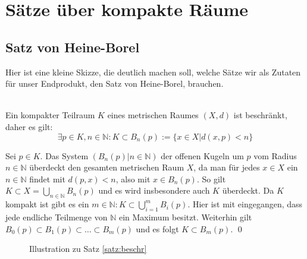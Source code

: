 \chapter{Sätze über kompakte Räume}

\section{Satz von Heine-Borel}
%
Hier ist eine kleine Skizze, die deutlich machen soll, welche Sätze wir als Zutaten für unser Endprodukt, den \glqq Satz von Heine-Borel\grqq, brauchen. \\
%
\\

%

\begin{Satz}\label{satz:beschr}
	Ein kompakter Teilraum \(K\) eines metrischen Raumes \( (X, d) \) ist beschränkt, daher es gilt:
	\[ \exists p \in K, n \in \mathbb{N} : K \subset B_n(p) := \{ x \in X | d(x,p) < n \} \]
\end{Satz}
	Sei \(p \in K\). Das System \( (B_{n}(p) | n \in \mathbb{N}) \) der offenen Kugeln um \(p\) vom Radius \(n \in \mathbb{N}\) 
	überdeckt den gesamten metrischen Raum \(X\), da man für jedes \(x \in X\) ein \(n \in \mathbb{N}\) findet mit \(d(p,x) < n\),
	also mit \(x \in B_{n}(p)\).
	So gilt \(K \subset X = \bigcup_{n \in \mathbb{N}} B_{n}(p)\) und es wird insbesondere auch \(K\) überdeckt. 
	Da \(K\) kompakt ist gibt es ein \(m \in \mathbb{N} : K \subset \bigcup_{i=1}^{m} B_{i}(p) \). Hier ist
	mit eingegangen, dass jede endliche Teilmenge von \(\mathbb{N}\) ein Maximum besitzt.
	Weiterhin gilt \( B_0(p) \subset B_1(p) \subset \dots \subset B_m(p) \) und es folgt \(K \subset B_m(p)\).
\qed

\begin{figure}[ht]
	\centering
	\def\svgwidth{200}
	
	\label{fig:beschraenktheit}
	\caption{Illustration zu Satz \ref{satz:beschr}}
\end{figure}

